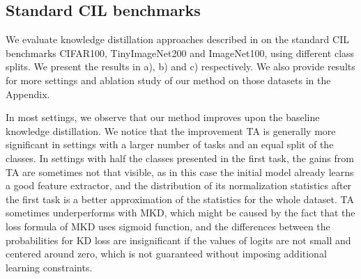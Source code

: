 \documentclass[10pt,twocolumn,letterpaper]{article}
\newcommand\rev[1]{{#1}}
\newcommand\todo[1]{{\color{red} [\bf TODO: #1]}}
\begin{document}
\subsection{Standard CIL benchmarks}
\label{sec:exp:benchmarks}
\rev{We evaluate knowledge distillation approaches described in \Cref{sec:kd_in_cl} on the standard CIL benchmarks CIFAR100, TinyImageNet200 and ImageNet100, using different class splits. We present the results in \Cref{tab:benchmarks} a), b) and c) respectively. We also provide results for more settings and ablation study of our method on those datasets in the Appendix.}



\rev{In most settings, we observe that our method improves upon the baseline knowledge distillation. We notice that the improvement TA is generally more significant in settings with a larger number of tasks and an equal split of the classes. In settings with half the classes presented in the first task, the gains from TA are sometimes not that visible, as in this case the initial model already learns a good feature extractor, and the distribution of its normalization statistics after the first task is a better approximation of the statistics for the whole dataset. TA sometimes underperforms with MKD, which might be caused by the fact that the loss formula of MKD uses sigmoid function, and the differences between the probabilities for KD loss are insignificant if the values of logits are not small and centered around zero, which is not guaranteed without imposing additional learning constraints.}



\end{document}
